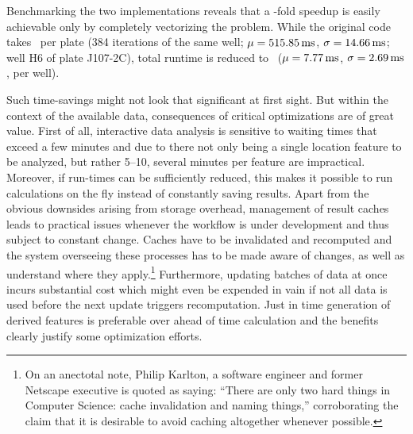 
Benchmarking the two implementations reveals that a \knitrScfBenchmarkSpeedup -fold speedup is easily achievable only by completely vectorizing the problem. While the original code takes \knitrScfBenchmarkEdgeTotal\ per plate (384 iterations of the same well; $\mu=\SI{515.85}{\milli\second}$, $\sigma=\SI{14.66}{\milli\second}$; well H6 of plate J107-2C), total runtime is reduced to \knitrScfBenchmarkFacetTotal\ ($\mu=\SI{7.77}{\milli\second}$, $\sigma=\SI{2.69}{\milli\second}$, per well).

Such time-savings might not look that significant at first sight. But within the context of the available data, consequences of critical optimizations are of great value. First of all, interactive data analysis is sensitive to waiting times that exceed a few minutes and due to there not only being a single location feature to be analyzed, but rather 5--10, several minutes per feature are impractical. Moreover, if run-times can be sufficiently reduced, this makes it possible to run calculations on the fly instead of constantly saving results. Apart from the obvious downsides arising from storage overhead, management of result caches leads to practical issues whenever the workflow is under development and thus subject to constant change. Caches have to be invalidated and recomputed and the system overseeing these processes has to be made aware of changes, as well as understand where they apply.\footnote{On an anectotal note, Philip Karlton, a software engineer and former Netscape executive is quoted as saying: ``There are only two hard things in Computer Science: cache invalidation and naming things,'' corroborating the claim that it is desirable to avoid caching altogether whenever possible.} Furthermore, updating batches of data at once incurs substantial cost which might even be expended in vain if not all data is used before the next update triggers recomputation. Just in time generation of derived features is preferable over ahead of time calculation and the benefits clearly justify some optimization efforts.

